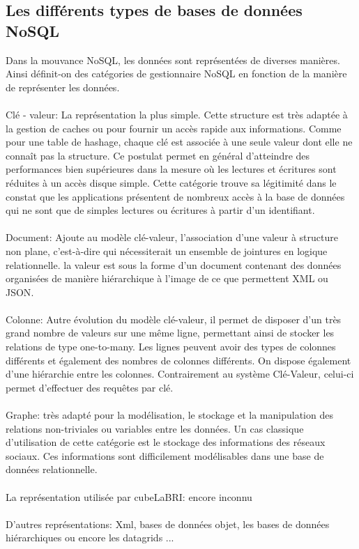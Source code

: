 \subsection{Les différents types de bases de données \textsf{NoSQL}} 
 
Dans la mouvance \textsf{NoSQL}, les données sont représentées de
diverses manières. Ainsi définit-on des catégories de gestionnaire
\textsf{NoSQL} en fonction de la manière de représenter les données.
\\\\ \textsf{Clé - valeur}: La
représentation la plus simple. Cette structure est très adaptée à la
gestion de caches ou pour fournir un accès rapide aux
informations. Comme pour une table de hashage, chaque clé est associée
à une seule valeur dont elle ne connaît pas la structure. Ce postulat
permet en général d’atteindre des performances bien supérieures dans
la mesure où les lectures et écritures sont réduites à un accès disque
simple. Cette catégorie trouve sa légitimité dans le constat que les
applications présentent de nombreux accès à la base de données qui ne
sont que de simples lectures ou écritures à partir d’un
identifiant\cite{cleValeur}.  \\\\ {\sf Document}:
Ajoute au modèle clé-valeur,
l’association d’une valeur à structure non plane, c’est-à-dire qui
nécessiterait un ensemble de jointures en logique relationnelle.  la
valeur est sous la forme d'un document contenant des données
organisées de manière hiérarchique à l’image de ce que permettent
\textsf{XML} ou \textsf{JSON}.  \\\\ {\sf Colonne}: Autre évolution du modèle clé-valeur, il permet de
disposer d'un très grand nombre de valeurs sur une même ligne,
permettant ainsi de stocker les relations de type one-to-many. Les
lignes peuvent avoir des types de colonnes différents et également des
nombres de colonnes différents. On dispose également d'une hiérarchie
entre les colonnes. Contrairement au système Clé-Valeur, celui-ci
permet d’effectuer des requêtes par clé.  \\\\ {\sf
  Graphe}: très adapté pour la modélisation, le
stockage et la manipulation des relations non-triviales ou variables
entre les données. Un cas classique d'utilisation de cette catégorie
est le stockage des informations des réseaux sociaux. Ces informations
sont difficilement modélisables dans une base de données
relationnelle.  \\ \\ {\color{red} {\sf La représentation utilisée par
    cubeLaBRI}: encore inconnu} \\ \\ \textsf{D'autres
  représentations}: \textsf{Xml}, \textsf{bases de données objet},
\textsf{les bases de données hiérarchiques ou encore les datagrids}
...

